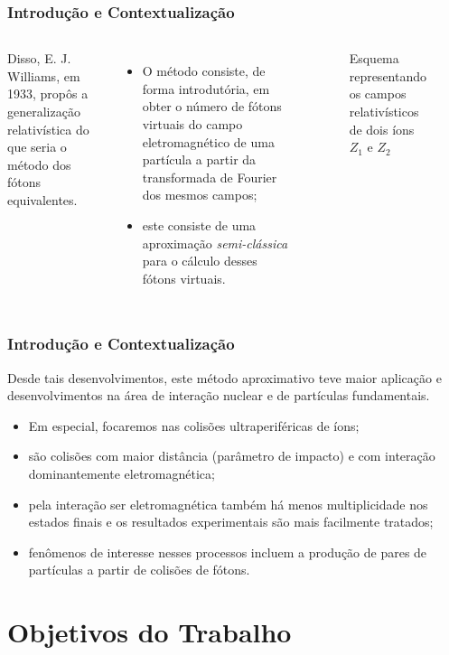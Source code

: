 \documentclass[xcolor=dvipsnames]{beamer}
\begin{document}
\begin{frame}
	\frametitle{Introdução e Contextualização}

	\begin{columns}

	Disso, E. J. Williams, em 1933, propôs a generalização relativística do que
	seria o método dos fótons equivalentes.
	\begin{itemize}
		\item O método consiste, de forma introdutória, em obter o número de 
			fótons virtuais do campo eletromagnético de uma partícula a
			partir da transformada de Fourier dos mesmos campos;
		\item este consiste de uma aproximação \textit{semi-clássica} para
			o cálculo desses fótons virtuais.
	\end{itemize}


	\begin{figure}
		
		\caption{Esquema representando os campos relativísticos de dois íons
		$Z_1$ e $Z_2$}
	\end{figure}
	\end{columns}
\end{frame}

\begin{frame}
	\frametitle{Introdução e Contextualização}

	Desde tais desenvolvimentos, este método aproximativo teve maior aplicação e
	desenvolvimentos na área de interação nuclear e de partículas fundamentais.

	\begin{itemize}
		\item Em especial, focaremos nas colisões ultraperiféricas de íons;
		\item são colisões com maior distância (parâmetro de impacto) e com
			interação dominantemente eletromagnética;
		\item pela interação ser eletromagnética também há menos multiplicidade
			nos estados finais e os resultados experimentais são mais facilmente
			tratados;
		\item fenômenos de interesse nesses processos incluem a produção de
			pares de partículas a partir de colisões de fótons.
	\end{itemize}
\end{frame}

\section{Objetivos do Trabalho}
\end{document}
